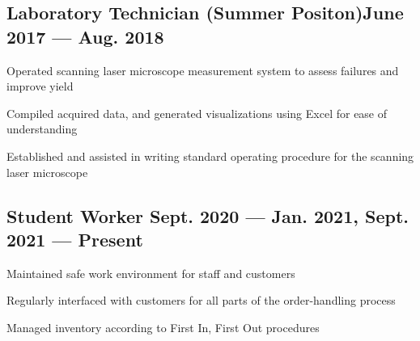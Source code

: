 \subsection{{Laboratory Technician (Summer Positon)\hfill June 2017 --- Aug. 2018}}
\begin{zitemize}
\item Operated scanning laser microscope measurement system to assess failures and improve yield
\item Compiled acquired data, and generated visualizations using Excel for ease of understanding
\item Established and assisted in writing standard operating procedure for the scanning laser microscope
\end{zitemize}

\subsection{{Student Worker \hfill Sept. 2020 --- Jan. 2021, Sept. 2021 --- Present}}
\begin{zitemize}
\item Maintained safe work environment for staff and customers
\item Regularly interfaced with customers for all parts of the order-handling process
\item Managed inventory according to First In, First Out procedures
\end{zitemize}

